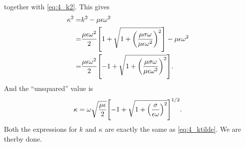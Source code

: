 \documentclass[11pt,letter, swedish, english
]{article}
\begin{document}
together with \eqref{eq:4_k2}. This gives
\begin{equation}
\begin{aligned}
\kappa^2 =& k^2-\mu\epsilon\omega^2\\
=&\frac{\mu\epsilon\omega^2}{2}
\qty[ 1 +\sqrt{
1+ \qty(\frac{\mu\sigma\omega}{\mu\epsilon\omega^2})^2
} ]
-\mu\epsilon\omega^2\\
=&\frac{\mu\epsilon\omega^2}{2}
\qty[ -1 +\sqrt{
1+ \qty(\frac{\mu\sigma\omega}{\mu\epsilon\omega^2})^2
} ].
\end{aligned}
\end{equation}
And the ``unsquared'' value is
\begin{equation}
\kappa = \omega\sqrt{\frac{\mu\epsilon}{2}}
\qty[ -1 +\sqrt{
1+ \qty(\frac{\sigma}{\epsilon\omega})^2
} ]^{1/2}.
\end{equation}
Both the expressions for $k$ and $\kappa$ are exactly the same as
\eqref{eq:4_ktilde}. We are therby done.
\end{document}
